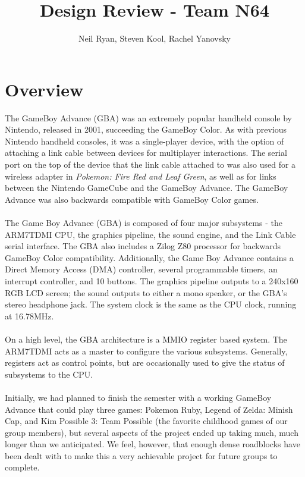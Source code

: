 \documentclass[11pt,a4paper,draft]{article}
\begin{document}
	\title{Design Review - Team N64}
	\author{Neil Ryan, Steven Kool, Rachel Yanovsky}
	\maketitle
	\newpage
	
	\section{Overview}
	The GameBoy Advance (GBA) was an extremely popular handheld console by Nintendo, released in 2001, succeeding the GameBoy Color. As with previous Nintendo handheld consoles, it was a single-player device, with the option of attaching a link cable between devices for multiplayer interactions. The serial port on the top of the device that the link cable attached to was also used for a wireless adapter in \textit{Pokemon: Fire Red and Leaf Green}, as well as for links between the Nintendo GameCube and the GameBoy Advance. The GameBoy Advance was also backwards compatible with GameBoy Color games.\\\\
	
	The Game Boy Advance (GBA) is composed of four major subsystems - the ARM7TDMI CPU, the graphics pipeline, the sound engine, and the Link Cable serial interface. The GBA also includes a Zilog Z80 processor for backwards GameBoy Color compatibility. Additionally, the Game Boy Advance contains a Direct Memory Access (DMA) controller, several programmable timers, an interrupt controller, and 10 buttons. The graphics pipeline outputs to a 240x160 RGB LCD screen; the sound outputs to either a mono speaker, or the GBA's stereo headphone jack. The system clock is the same as the CPU clock, running at 16.78MHz.\cite{GBAManual} \\\\	
	On a high level, the GBA architecture is a MMIO register based system. The ARM7TDMI acts as a master to configure the various subsystems. Generally, registers act as control points, but are occasionally used to give the status of subsystems to the CPU.\\\\
	Initially, we had planned to finish the semester with a working GameBoy Advance that could play three games: Pokemon Ruby, Legend of Zelda: Minish Cap, and Kim Possible 3: Team Possible (the favorite childhood games of our group members), but several aspects of the project ended up taking much, much longer than we anticipated. We feel, however, that enough dense roadblocks have been dealt with to make this a very achievable project for future groups to complete.\\\\
	
\end{document}
